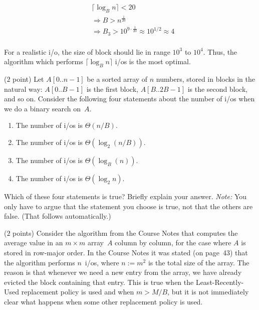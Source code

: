 \documentclass{article}
\newcommand{\io}{{\sc i/o}\xspace}
\newcommand{\ios}{{\io}s\xspace}
\newcounter{rcounter}
\newenvironment{rlist}%
{\begin{list}{\setnr-\arabic{rcounter}}{\usecounter{rcounter}}}{\end{list}}
\begin{document}
\begin{rlist}
\begin{enumerate}
            \begin{align*}
            &\lceil \log_B n \rceil < 20\\
            &\Longrightarrow B > n^{\frac{1}{20}}\\
            &\Longrightarrow B_3 > 10^{9 \cdot \frac{1}{20}} \approx 10^{1/2} \approx 4\\
            \end{align*}
        \end{enumerate}
        For a realistic \io, the size of block should lie in range $10^3$ to $10^4$. Thus, the algorithm which performs $\lceil \log_B n \rceil$ \ios is the most optimal.
        \item ($2$ point)
        Let $A[0..n-1]$ be a sorted array of $n$ numbers, stored in blocks in the natural
        way: $A[0..B-1]$ is the first block, $A[B..2B-1]$ is the second block, and so on.
        Consider the following four statements about the number of \ios when we
        do a binary search on~$A$.
        \begin{enumerate}
            \item[(I)]
            The number of \ios is $\Theta(n/B)$.
            \item[(II)]
            The number of \ios is $\Theta(\log_2 (n/B))$.
            \item[(III)]
            The number of \ios is $\Theta(\log_B(n))$.
            \item[(IV)]
            The number of \ios is $\Theta(\log_2 n)$.
        \end{enumerate}
        Which of these four statements is true? Briefly explain your answer. \emph{Note:} You only have to argue that the statement you choose is true, not that the others are false. (That follows automatically.)
        
        
        \item ($2$ points)
        Consider the algorithm from the Course Notes that computes the average value in an $m\times m$ array~$A$ column by column, for the case where $A$ is stored in row-major order. In the Course Notes it was stated (on page~43) that the algorithm performs $n$~\ios, where $n := m^2$ is the total size of the array. The reason is that whenever we need a new entry from the array, we have already evicted the block containing that entry. This is true when the Least-Recently-Used replacement policy is used and when $m > M/B$, but it is not immediately clear what happens when some other replacement policy is used.
        

\end{rlist}
\end{document}
